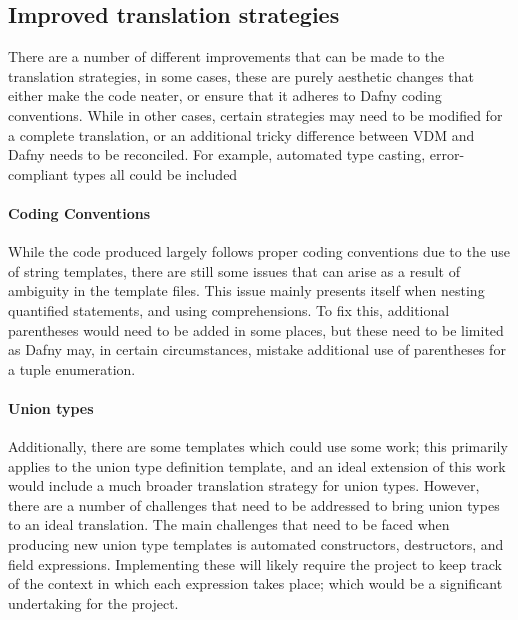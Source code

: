 \documentclass{entcs}
\newcommand{\lfcomment}[1]{\ifthenelse { \boolean{showComments} } {\textcolor{red}{LF:~#1}} { } } %
\begin{document}
\subsection{Improved translation strategies}


There are a number of different improvements that can be made to the translation strategies, in some cases, these are purely aesthetic changes that either make the code neater, or ensure that it adheres to Dafny coding conventions. While in other cases, certain strategies may need to be modified for a complete translation, or an additional tricky difference between VDM and Dafny needs to be reconciled. For example, automated type casting, error-compliant types all could be included

\paragraph{Coding Conventions}

While the code produced largely follows proper coding conventions due to the use of string templates, there are still some issues that can arise as a result of ambiguity in the template files. This issue mainly presents itself when nesting quantified statements, and using comprehensions. To fix this, additional parentheses would need to be added in some places, but these need to be limited as Dafny may, in certain circumstances, mistake additional use of parentheses for a tuple enumeration.

\paragraph{Union types}\label{section:union}

Additionally, there are some templates which could use some work; this primarily applies to the union type definition template, and an ideal extension of this work would include a much broader translation strategy for union types. However, there are a number of challenges that need to be addressed to bring union types to an ideal translation. The main challenges that need to be faced when producing new union type templates is automated constructors, destructors, and field expressions. Implementing these will likely require the project to keep track of the context in which each expression takes place; which would be a significant undertaking for the project.
\end{document}
